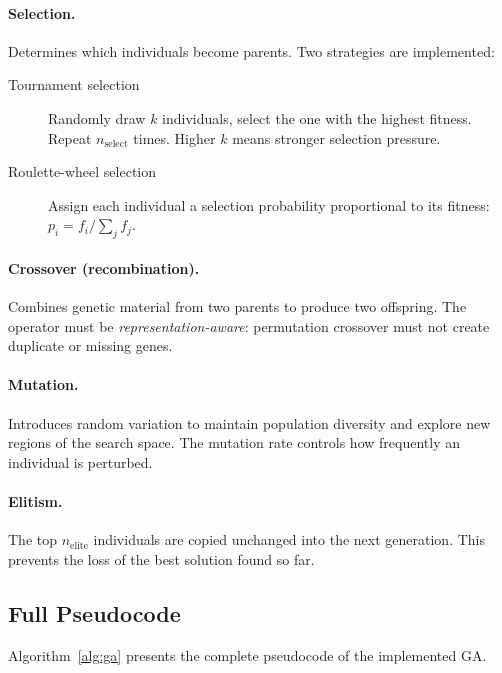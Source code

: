 \documentclass[12pt,a4paper]{article}
\begin{document}
\paragraph{Selection.}
Determines which individuals become parents. Two strategies are implemented:
\begin{description}
    \item[Tournament selection] Randomly draw $k$ individuals, select the one with the highest fitness. Repeat $n_\text{select}$ times. Higher $k$ means stronger selection pressure.
    \item[Roulette-wheel selection] Assign each individual a selection probability proportional to its fitness: $p_i = f_i / \sum_j f_j$.
\end{description}

\paragraph{Crossover (recombination).}
Combines genetic material from two parents to produce two offspring. The operator must be \emph{representation-aware}: permutation crossover must not create duplicate or missing genes.

\paragraph{Mutation.}
Introduces random variation to maintain population diversity and explore new regions of the search space. The mutation rate controls how frequently an individual is perturbed.

\paragraph{Elitism.}
The top $n_\text{elite}$ individuals are copied unchanged into the next generation. This prevents the loss of the best solution found so far.

\subsection{Full Pseudocode}

Algorithm~\ref{alg:ga} presents the complete pseudocode of the implemented GA.
\end{document}
